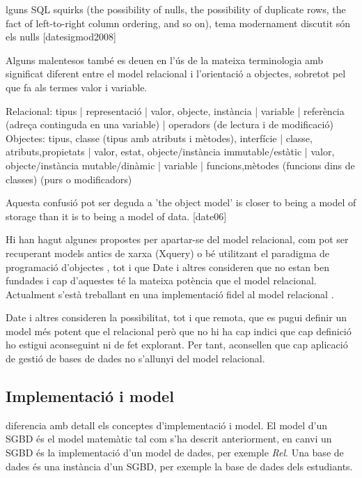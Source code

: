 lguns SQL squirks (the possibility of nulls, the possibility of duplicate rows, the
fact of left-to-right column ordering, and so on), tema modernament discutit són els nulls [datesigmod2008]

Alguns malentesos també es deuen en l'ús de la mateixa terminologia amb significat diferent entre el model relacional i l'orientació a objectes, sobretot pel que fa als termes valor i variable. 

Relacional: tipus | representació |  valor, objecte, instància  | variable  | referència (adreça continguda en una variable) | operadors (de lectura i de modificació)
Objectes: tipus, classe (tipus amb atributs i mètodes), interfície | classe, atributs,propietats  |  valor, estat, objecte/instància immutable/estàtic |  valor, objecte/instància mutable/dinàmic  | variable | funcions,mètodes (funcions dins de classes) (purs o modificadors)

Aquesta confusió pot ser deguda a 'the object model' is closer to being a model of storage than it is to being a model of data. [date06]


Hi han hagut algunes propostes per apartar-se del model relacional, com pot ser recuperant models antics de xarxa (Xquery) o bé utilitzant el paradigma de programació d'objectes , tot i que Date i altres consideren que no estan ben fundades i cap d'aquestes té la mateixa potència que el model relacional. Actualment s'està treballant en una implementació fidel al model relacional . 

Date i altres consideren la possibilitat, tot i que remota, que es pugui definir un model més potent que el relacional però que no hi ha cap indici que cap definició ho estigui aconseguint ni de fet explorant. Per tant, aconsellen que cap aplicació de gestió de bases de dades no s'allunyi del model relacional.





\subsection{Implementació i model}

\textcite{date:introduction} diferencia amb detall els conceptes d'implementació i model.
El model d'un SGBD és el model matemàtic tal com s'ha descrit anteriorment, en canvi un SGBD és la implementació d'un model de dades, per exemple \emph{Rel}.
Una base de dades és una instància d'un SGBD, per exemple la base de dades dels estudiants.



